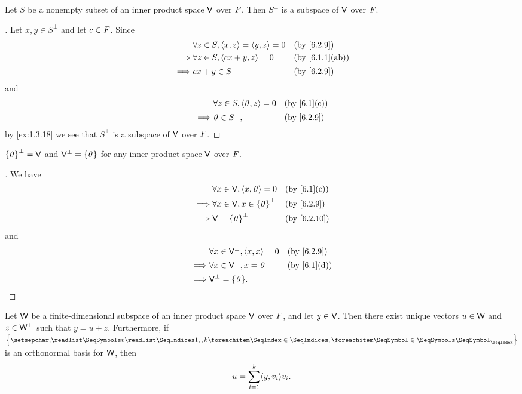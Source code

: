 \begin{prop}\label{6.2.10}
	Let \(S\) be a nonempty subset of an inner product space \(\mathsf{V}\) over \(\mathit{F}\).
	Then \(S^{\perp}\) is a subspace of \(\mathsf{V}\) over \(\mathit{F}\).
\end{prop}

\begin{proof}[]
	Let \(x, y \in S^{\perp}\) and let \(c \in \mathit{F}\).
	Since
	\begin{align*}
		         & \forall z \in S, \inn{x, z} = \inn{y, z} = 0 &  & \by{6.2.9}     \\
		\implies & \forall z \in S, \inn{cx + y, z} = 0         &  & \by{6.1.1}[ab] \\
		\implies & cx + y \in S^{\perp}                         &  & \by{6.2.9}
	\end{align*}
	and
	\begin{align*}
		         & \forall z \in S, \inn{\zv, z} = 0 &  & \by{6.1}[c] \\
		\implies & \zv \in S^{\perp},                &  & \by{6.2.9}
	\end{align*}
	by \cref{ex:1.3.18} we see that \(S^{\perp}\) is a subspace of \(\mathsf{V}\) over \(\mathit{F}\).
\end{proof}

\begin{eg}\label{6.2.11}
	\(\left\lbrace\mathit{0}\right\rbrace^{\perp} = \mathsf{V}\) and \(\mathsf{V}^{\perp} = \left\lbrace\mathit{0}\right\rbrace\) for any inner product space \(\mathsf{V}\) over \(\mathit{F}\).
\end{eg}

\begin{proof}[]
	We have
	\begin{align*}
		         & \forall x \in \V, \inn{x, \zv} = 0        &  & \by{6.1}[c] \\
		\implies & \forall x \in \V, x \in \set{\zv}^{\perp} &  & \by{6.2.9}  \\
		\implies & \V = \set{\zv}^{\perp}                    &  & \by{6.2.10}
	\end{align*}
	and
	\begin{align*}
		         & \forall x \in \V^{\perp}, \inn{x, x} = 0 &  & \by{6.2.9}  \\
		\implies & \forall x \in \V^{\perp}, x = \zv        &  & \by{6.1}[d] \\
		\implies & \V^{\perp} = \set{\zv}.
	\end{align*}
\end{proof}

\begin{thm}\label{6.6}
	Let \(\mathsf{W}\) be a finite-dimensional subspace of an inner product space \(\mathsf{V}\) over \(\mathit{F}\), and let \(y \in \mathsf{V}\).
	Then there exist unique vectors \(u \in \mathsf{W}\) and \(z \in \mathsf{W}^{\perp}\) such that \(y = u + z\).
	Furthermore, if \(\set{\seq{v}{1,,k}}\) is an orthonormal basis for \(\mathsf{W}\), then
	\[
		u = \sum_{i = 1}^k \inn{y, v_i} v_i.
	\]
\end{thm}

